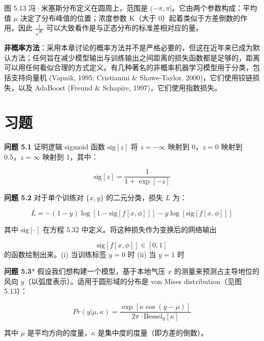 图 5.13 冯·米塞斯分布定义在圆周上，范围是 \((−\pi, \pi]\)。它由两个参数构成：平均值 \(\mu\) 决定了分布峰值的位置；浓度参数 K（大于 0）起着类似于方差倒数的作用，因此 \(\frac{1}{\sqrt{\kappa}}\) 可以大致看作是与正态分布的标准差相对应的量。

\textbf{非概率方法}：采用本章讨论的概率方法并不是严格必要的，但这在近年来已成为默认方法；任何旨在减少模型输出与训练输出之间距离的损失函数都是足够的，距离可以用任何看似合理的方式定义。有几种著名的非概率机器学习模型用于分类，包括支持向量机 (Vapnik, 1995; Cristianini \& Shawe-Taylor, 2000)，它们使用铰链损失，以及 AdaBoost (Freund \& Schapire, 1997)，它们使用指数损失。


\section{习题}

\textbf{问题 5.1} 证明逻辑 sigmoid 函数 \(\text{sig}[z]\) 将 \(z = -\infty\) 映射到 0，\(z = 0\) 映射到 0.5，\(z = \infty\) 映射到 1，其中：

\begin{equation}
\text{sig}[z] = \frac{1}{1 + \exp[-z]} 
\end{equation}

\textbf{问题 5.2} 对于单个训练对 \(\{x, y\}\) 的二元分类，损失 \(L\) 为：

\begin{equation}
L = -(1 - y) \log [1 - \text{sig}[f[x, \phi]]] - y \log [\text{sig}[f[x, \phi]]] 
\end{equation}

其中 \(\text{sig}[\cdot]\) 在方程 5.32 中定义。将这种损失作为变换后的网络输出 

\begin{equation*}
	\text{sig}[f[x, \phi]] \in [0, 1]	
\end{equation*}
的函数绘制出来。(i) 当训练标签 \(y = 0\) 时 \hspace*{\fill} (ii) 当 \(y = 1\) 时 \hspace*{\fill} 


\textbf{问题 5.3}* 假设我们想构建一个模型，基于本地气压 \(x\) 的测量来预测占主导地位的风向 \(y\)（以弧度表示）。适用于圆形域的分布是 von Mises distribution（见图 5.13）：

\begin{equation}
Pr(y|\mu, \kappa) = \frac{\exp[\kappa \cos(y - \mu)]}{2\pi \cdot \text{Bessel}_0[\kappa]} 
\end{equation}

其中 \(\mu\) 是平均方向的度量，\(\kappa\) 是集中度的度量（即方差的倒数）。

